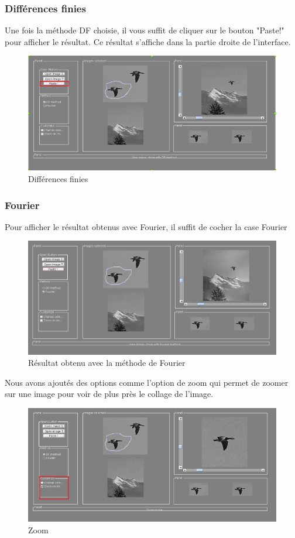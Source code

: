 \subsubsection{Différences finies}
Une fois la méthode DF choisie, il vous suffit de cliquer sur le bouton "Paste!" pour afficher le résultat. Ce résultat s'affiche dans la partie droite de l'interface. 
\begin{figure}[!ht]
    \centering
    \includegraphics[scale = 0.3]{Images/DF.png}
    \caption{Différences finies}
\end{figure}{}
\newpage
\subsubsection{Fourier}
Pour afficher le résultat obtenus avec Fourier, il suffit de cocher la case Fourier
\begin{figure}[!h]
    \centering
    \includegraphics[scale = 0.2]{Images/fourier.png}
    \caption{Résultat obtenu avec la méthode de Fourier}
\end{figure}{}
Nous avons ajoutés des options comme l'option de zoom qui permet de zoomer sur une image pour voir de plus près le collage de l'image. 

\begin{figure}[!h]
    \centering
    \includegraphics[scale = 0.3]{Images/zomm.png}
    \caption{Zoom}
\end{figure}{}
